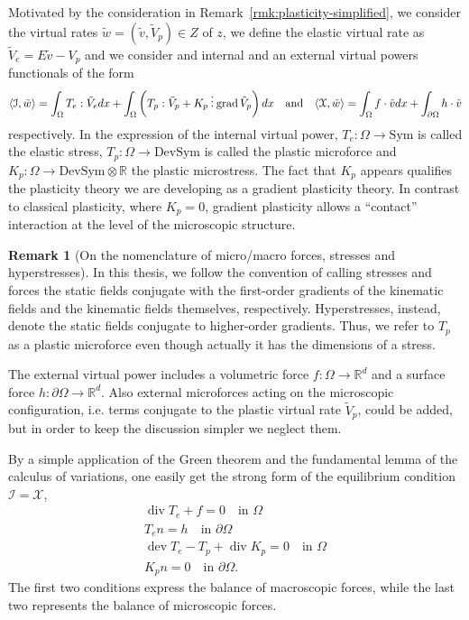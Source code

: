 \documentclass[a4paper,10pt,oneside]{amsbook}
\numberwithin{section}{chapter}
\numberwithin{equation}{chapter}
\theoremstyle{definition}
\newtheorem{rmk}[prop]{Remark}
\DeclareMathOperator{\dev}{dev}
\DeclareMathOperator{\diver}{div}
\DeclareMathOperator{\grad}{grad}
\DeclarePairedDelimiter{\dual}{\langle}{\rangle}
\newcommand{\threedots}{\mathbin{\vdots}}
\begin{document}
Motivated by the consideration in Remark~\ref{rmk:plasticity-simplified}, we consider the virtual rates $\tilde w=(\tilde v,\tilde V_p)\in Z$ of $z$, we define the elastic virtual rate as $\tilde V_e=E\tilde v-V_p$ and we consider and internal and an external virtual powers functionals of the form
\begin{equation}
\label{eqn:powers-plasticity}
\dual{\mathcal{I},\tilde w}=\int_\Omega T_e:\tilde V_edx+\int_\Omega\left(T_p:\tilde V_p+K_p\threedots\grad\tilde V_p\right)dx
\quad\text{and}\quad
\dual{\mathcal{X},\tilde w}=\int_\Omega f\cdot\tilde vdx+\int_{\partial\Omega}h\cdot\tilde v
\end{equation}
respectively. In the expression of the internal virtual power, $T_e\colon\Omega\to\text{Sym}$ is called the elastic stress, $T_p\colon\Omega\to\text{DevSym}$ is called the plastic microforce and $K_p\colon\Omega\to\text{DevSym}\otimes\mathbb{R}$ the plastic microstress. The fact that $K_p$ appears qualifies the plasticity theory we are developing as a gradient plasticity theory. In contrast to classical plasticity, where $K_p=0$, gradient plasticity allows a ``contact'' interaction at the level of the microscopic structure.
\begin{rmk}[On the nomenclature of micro/macro forces, stresses and hyperstresses]
In this thesis, we follow the convention of calling stresses and forces the static fields conjugate with the first-order gradients of the kinematic fields and the kinematic fields themselves, respectively. Hyperstresses, instead, denote the static fields conjugate to higher-order gradients. Thus, we refer to $T_p$ as a plastic microforce even though actually it has the dimensions of a stress.
\end{rmk}
The external virtual power includes a volumetric force $f\colon\Omega\to\mathbb{R}^d$ and a surface force $h\colon\partial\Omega\to\mathbb{R}^d$. Also external microforces acting on the microscopic configuration, i.e. terms conjugate to the plastic virtual rate $\tilde V_p$, could be added, but in order to keep the discussion simpler we neglect them.

By a simple application of the Green theorem and the fundamental lemma of the calculus of variations, one easily get the strong form of the equilibrium condition $\mathcal{I}=\mathcal{X}$,
\begin{subequations}
\label{eqn:equilibrium-plasticity}
\begin{gather}
\diver T_e+f=0\quad\text{in $\Omega$} \\
T_en=h\quad\text{in $\partial\Omega$} \\
\dev T_e-T_p+\diver K_p=0\quad\text{in $\Omega$} \\
K_pn=0\quad\text{in $\partial\Omega$}.
\end{gather}
\end{subequations}
The first two conditions express the balance of macroscopic forces, while the last two represents the balance of microscopic forces.
\end{document}
